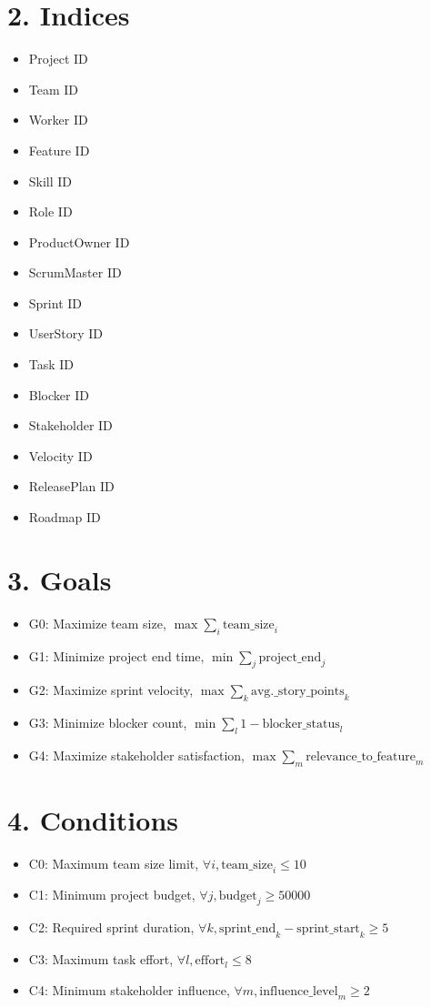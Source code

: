 \documentclass{article}
\begin{document}
\section{2. Indices}
\begin{itemize}
    \item Project ID
    \item Team ID
    \item Worker ID
    \item Feature ID
    \item Skill ID
    \item Role ID
    \item ProductOwner ID
    \item ScrumMaster ID
    \item Sprint ID
    \item UserStory ID
    \item Task ID
    \item Blocker ID
    \item Stakeholder ID
    \item Velocity ID
    \item ReleasePlan ID
    \item Roadmap ID
\end{itemize}

\section{3. Goals}
\begin{itemize}
    \item G0: Maximize team size, \( \max \sum_{i} \text{team\_size}_i \)
    \item G1: Minimize project end time, \( \min \sum_{j} \text{project\_end}_j \)
    \item G2: Maximize sprint velocity, \( \max \sum_{k} \text{avg.\_story\_points}_k \)
    \item G3: Minimize blocker count, \( \min \sum_{l} 1 - \text{blocker\_status}_l \)
    \item G4: Maximize stakeholder satisfaction, \( \max \sum_{m} \text{relevance\_to\_feature}_m \)
\end{itemize}

\section{4. Conditions}
\begin{itemize}
    \item C0: Maximum team size limit, \( \forall i, \text{team\_size}_i \leq 10 \)
    \item C1: Minimum project budget, \( \forall j, \text{budget}_j \geq 50000 \)
    \item C2: Required sprint duration, \( \forall k, \text{sprint\_end}_k - \text{sprint\_start}_k \geq 5 \)
    \item C3: Maximum task effort, \( \forall l, \text{effort}_l \leq 8 \)
    \item C4: Minimum stakeholder influence, \( \forall m, \text{influence\_level}_m \geq 2 \)
\end{itemize}
\end{document}
